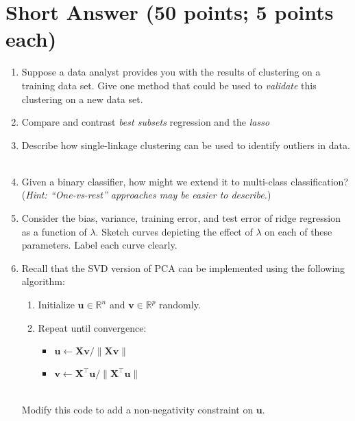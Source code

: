 \documentclass[12pt]{article}
\newcommand{\bX}{\bm{X}}
\newcommand{\bu}{\bm{u}}
\newcommand{\bv}{\bm{v}}
\begin{document}
\clearpage

\section*{Short Answer (50 points; 5 points each)}

\begin{enumerate}[label={SA\arabic*.}]
\item Suppose a data analyst provides you with the results of clustering on a training data set. Give one method that could be used to \emph{validate} this clustering on a new data set. ~ \\ \vspace{2in}
\item Compare and contrast \emph{best subsets} regression and the \emph{lasso}  ~ \\ \vspace{2in}
\item Describe how single-linkage clustering can be used to identify outliers in data.  ~ \\ \vspace{2in}
\item Given a binary classifier, how might we extend it to multi-class classification? (\emph{Hint: ``One-vs-rest'' approaches may be easier to describe.}) ~ \\ \vspace{2in}
\item Consider the bias, variance, training error, and test error of ridge regression as a function of $\lambda$. Sketch curves depicting the effect of $\lambda$ on each of these parameters. Label each curve clearly.  ~ \\ \vspace{2in}
\item Recall that the SVD version of PCA can be implemented using the following algorithm: 
\begin{algorithm}
    \begin{enumerate}
        \item Initialize $\bu \in \mathbb{R}^n$ and $\bv \in \mathbb{R}^p$ randomly.
        \item Repeat until convergence:
        \begin{itemize}
            \item $\bu \leftarrow \bX\bv / \|\bX\bv\|$
            \item $\bv \leftarrow \bX^{\top}\bu / \|\bX^{\top}\bu\|$
        \end{itemize}
    \end{enumerate}
\end{algorithm}
~~
\\
Modify this code to add a non-negativity constraint on $\bu$.


\end{enumerate}
\end{document}
